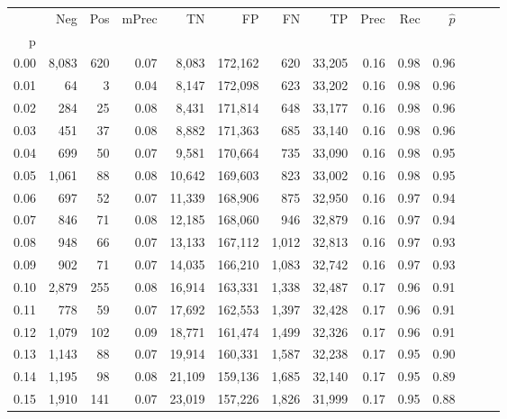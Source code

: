 \begin{tabular}{rrrrrrrrrrrrrr}
\toprule
{} &    Neg &  Pos & mPrec &       TN &       FP &      FN &      TP &  Prec &   Rec & $\hat{p}$ \\
p    &        &      &       &          &          &         &         &       &       &           \\
\midrule
0.00 &  8,083 &  620 &  0.07 &    8,083 &  172,162 &     620 &  33,205 &  0.16 &  0.98 &      0.96 \\
0.01 &     64 &    3 &  0.04 &    8,147 &  172,098 &     623 &  33,202 &  0.16 &  0.98 &      0.96 \\
0.02 &    284 &   25 &  0.08 &    8,431 &  171,814 &     648 &  33,177 &  0.16 &  0.98 &      0.96 \\
0.03 &    451 &   37 &  0.08 &    8,882 &  171,363 &     685 &  33,140 &  0.16 &  0.98 &      0.96 \\
0.04 &    699 &   50 &  0.07 &    9,581 &  170,664 &     735 &  33,090 &  0.16 &  0.98 &      0.95 \\
0.05 &  1,061 &   88 &  0.08 &   10,642 &  169,603 &     823 &  33,002 &  0.16 &  0.98 &      0.95 \\
0.06 &    697 &   52 &  0.07 &   11,339 &  168,906 &     875 &  32,950 &  0.16 &  0.97 &      0.94 \\
0.07 &    846 &   71 &  0.08 &   12,185 &  168,060 &     946 &  32,879 &  0.16 &  0.97 &      0.94 \\
0.08 &    948 &   66 &  0.07 &   13,133 &  167,112 &   1,012 &  32,813 &  0.16 &  0.97 &      0.93 \\
0.09 &    902 &   71 &  0.07 &   14,035 &  166,210 &   1,083 &  32,742 &  0.16 &  0.97 &      0.93 \\
0.10 &  2,879 &  255 &  0.08 &   16,914 &  163,331 &   1,338 &  32,487 &  0.17 &  0.96 &      0.91 \\
0.11 &    778 &   59 &  0.07 &   17,692 &  162,553 &   1,397 &  32,428 &  0.17 &  0.96 &      0.91 \\
0.12 &  1,079 &  102 &  0.09 &   18,771 &  161,474 &   1,499 &  32,326 &  0.17 &  0.96 &      0.91 \\
0.13 &  1,143 &   88 &  0.07 &   19,914 &  160,331 &   1,587 &  32,238 &  0.17 &  0.95 &      0.90 \\
0.14 &  1,195 &   98 &  0.08 &   21,109 &  159,136 &   1,685 &  32,140 &  0.17 &  0.95 &      0.89 \\
0.15 &  1,910 &  141 &  0.07 &   23,019 &  157,226 &   1,826 &  31,999 &  0.17 &  0.95 &      0.88 \\

\end{tabular}
